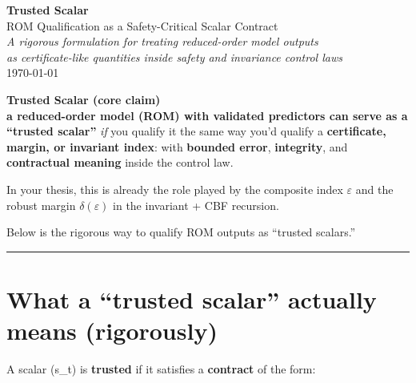 \documentclass[11pt,a4paper]{article}
\begin{document}
\begin{titlepage}
\centering
\vspace*{2cm}

{\Huge\bfseries\color{darkblue} Trusted Scalar}\\[0.5cm]
{\Large\color{darkblue} ROM Qualification as a Safety-Critical Scalar Contract}\\[2cm]

{\large\itshape A rigorous formulation for treating reduced-order model outputs\\
as certificate-like quantities inside safety and invariance control laws}\\[4cm]

\vfill
{\large\color{darkblue}\today}

\end{titlepage}

\tableofcontents
\newpage


\begin{definition}
\textbf{Trusted Scalar (core claim)}\\
\textbf{a reduced-order model (ROM) with validated predictors can serve as a “trusted scalar”} \textit{if} you qualify it the same way you’d qualify a \textbf{certificate, margin, or invariant index}: with \textbf{bounded error}, \textbf{integrity}, and \textbf{contractual meaning} inside the control law.

In your thesis, this is already the role played by the composite index \textbf{$\varepsilon$} and the robust margin \textbf{$\delta(\varepsilon)$} in the invariant + CBF recursion.

Below is the rigorous way to qualify ROM outputs as “trusted scalars.”
\end{definition}

\hrule
\vspace{0.75em}

\section{What a ``trusted scalar'' actually means (rigorously)}

A scalar (s\_t) is \textbf{trusted} if it satisfies a \textbf{contract} of the form:
\end{document}
